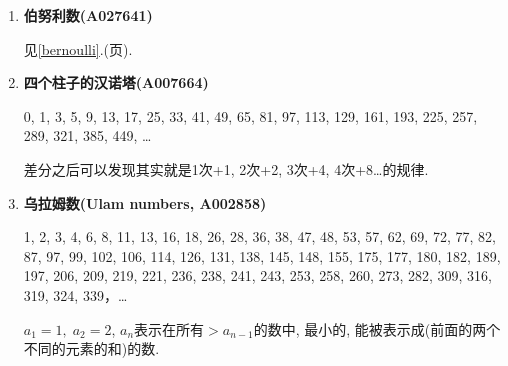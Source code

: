 \begin{enumerate}

\item \textbf{伯努利数(A027641)}

见\ref{bernoulli}.(\pageref{bernoulli}页).

\item \textbf{四个柱子的汉诺塔(A007664)}

0, 1, 3, 5, 9, 13, 17, 25, 33, 41, 49, 65, 81, 97, 113, 129, 161, 193, 225, 257, 289, 321, 385, 449, \dots

差分之后可以发现其实就是1次+1, 2次+2, 3次+4, 4次+8\dots 的规律.

\item \textbf{乌拉姆数(Ulam numbers, A002858)}

1, 2, 3, 4, 6, 8, 11, 13, 16, 18, 26, 28, 36, 38, 47, 48, 53, 57, 62, 69, 72, 77, 82, 87, 97, 99, 102, 106, 114, 126, 131, 138, 145, 148, 155, 175, 177, 180, 182, 189, 197, 206, 209, 219, 221, 236, 238, 241, 243, 253, 258, 260, 273, 282, 309, 316, 319, 324, 339，\dots

$ a_1 = 1,\; a_2 = 2 $, $a_n$表示在所有$>a_{n-1}$的数中, 最小的, 能被表示成(前面的两个不同的元素的和)的数.

\end{enumerate}